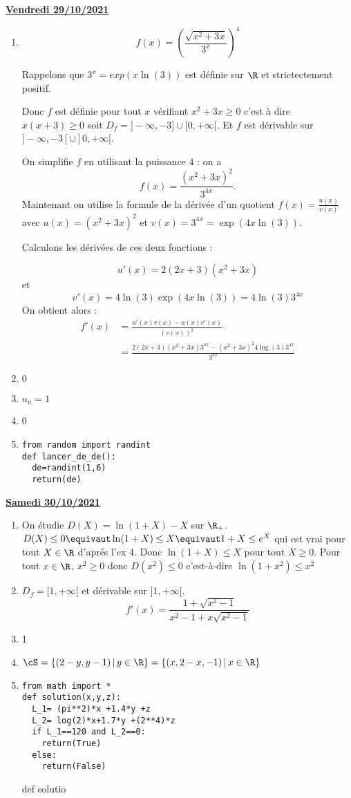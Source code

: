 \documentclass[a4paper, 11pt,reqno]{article}
\newcommand{\jour}[1]{
\begin{center}
\underline{\textbf{#1}}
\end{center}

 }
\begin{document}
\jour{Vendredi 29/10/2021}
\begin{correction}
\begin{enumerate}
\item
$$f(x) = \left( \frac{\sqrt{x^2+3x}}{3^x}\right)^4$$

Rappelons que $3^x=exp(x \ln (3)) $ est définie sur $\R$ et strictectement positif. 

Donc $f$ est définie pour tout $x$ vérifiant $x^2+3x \geq 0 $ c'est à dire $x(x+3)\geq 0$ soit $D_f=]-\infty , -3]\cup [0,+\infty[$.
Et $f$ est dérivable sur $]-\infty , -3[\cup ]0,+\infty[$.

On simplifie $f$  en utilisant la puissance $4$ : on a $$f(x) = \frac{(x^2+3x)^2}{3^{4x}}.$$
Maintenant on utilise la formule de la dérivée d'un quotient $f(x) =\frac{u(x)}{v(x)}$ avec 
$u(x) = (x^2+3x)^2$ et $v(x) = 3^{4x} =\exp(4x\ln(3))$. 

Calculons les dérivées de ces deux fonctions : 

$$u'(x) = 2 (2x+3) (x^2+3x)$$ et 
$$v'(x) = 4\ln(3) \exp(4x\ln(3) ) =4\ln(3) 3^{4x} $$
On obtient alors : 
\begin{align*}
f'(x) &= \frac{u'(x)v(x) - u(x)v'(x) }{(v(x))^2}\\
&= \frac{2(2x+3)(x^2+3x)3^{4x}-(x^2+3x)^2 4\log(3) 3^{4x}}{3^{8x}}
\end{align*}


\item $0$
\item $u_n=1$
\item 0
\item 
\begin{lstlisting}
from random import randint
def lancer_de_de():
  de=randint(1,6)
  return(de)
\end{lstlisting}
\end{enumerate}
\end{correction} 


\jour{Samedi 30/10/2021}
\begin{correction}
\begin{enumerate}
\item On étudie $D(X) =\ln(1+X) -X$ sur $\R_+$. $D(X)\leq 0 \equivaut \ln(1+X)\leq X \equivaut 1+X\leq e^X$ qui est vrai pour tout $X\in \R$ d'aprés l'ex 4.
Donc $\ln(1+X) \leq X$ pour tout $X\geq 0$. Pour tout $x\in \R$, $x^2 \geq 0$ donc 
$D(x^2) \leq 0$ c'est-à-dire $\ln(1+x^2)\leq x^2$
\item $D_f = [1,+\infty[$ et dérivable sur $]1, +\infty[$. 
$$f'(x) = \frac{1+\sqrt{x^2-1}}{x^2-1+x\sqrt{x^2-1}}$$
\item 1
\item $\cS=\{ (2-y,y -1) \, |\, y\in \R\} =\{ (x,2-x, -1) \, |\, x\in \R\}$
\item 
\begin{lstlisting}
from math import *
def solution(x,y,z):
  L_1= (pi**2)*x +1.4*y +z 
  L_2= log(2)*x+1.7*y +(2**4)*z
  if L_1==120 and L_2==0:
    return(True)
  else:
    return(False)
\end{lstlisting}
def solutio
\end{enumerate}
\end{correction} 
\end{document}
